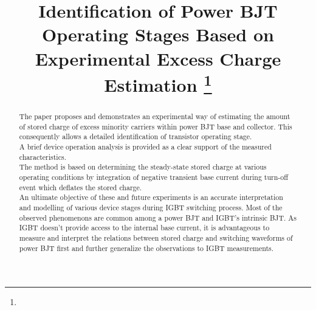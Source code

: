 \documentclass[conference]{IEEEtran}
\begin{document}
\title{Identification of Power BJT Operating Stages Based on Experimental Excess Charge Estimation
\thanks{}
}

\author{
\and
{}
}

\maketitle

\begin{abstract}
    The paper proposes and demonstrates an experimental way of estimating the amount of stored charge of excess minority carriers within power BJT base and collector. This consequently allows a detailed identification of transistor operating stage.\\
    A brief device operation analysis is provided as a clear support of the measured characteristics.\\
    The method is based on determining the steady-state stored charge at various operating conditions by integration of negative transient base current during turn-off event which deflates the stored charge.\\
    An ultimate objective of these and future experiments is an accurate interpretation and modelling of various device stages during IGBT switching process. Most of the observed phenomenons are common among a power BJT and IGBT's intrinsic BJT. As IGBT doesn't provide access to the internal base current, it is advantageous to measure and interpret the relations between stored charge and switching waveforms of power BJT first and further generalize the observations to IGBT measurements.\\
\end{abstract}
\end{document}
